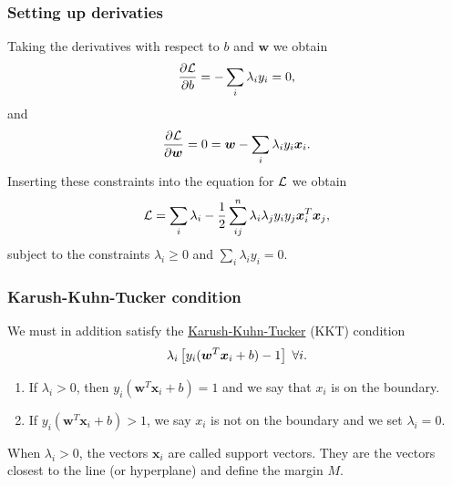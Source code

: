 \documentclass{beamer}
\begin{document}
\begin{frame}
\frametitle{Setting up derivaties}

Taking the derivatives  with respect to $b$ and $\bm{w}$ we obtain 
\[
\frac{\partial {\cal L}}{\partial b} = -\sum_{i} \lambda_iy_i=0,
\]
and 
\[
\frac{\partial {\cal L}}{\partial \bm{w}} = 0 = \bm{w}-\sum_{i} \lambda_iy_i\bm{x}_i.
\]
Inserting these constraints into the equation for ${\cal L}$ we obtain
\[
{\cal L}=\sum_i\lambda_i-\frac{1}{2}\sum_{ij}^n\lambda_i\lambda_jy_iy_j\bm{x}_i^T\bm{x}_j,
\]
subject to the constraints $\lambda_i\geq 0$ and $\sum_i\lambda_iy_i=0$.
\end{frame}

\begin{frame}
\frametitle{Karush-Kuhn-Tucker condition}

We must in addition satisfy the \href{{https://en.wikipedia.org/wiki/Karush%E2%80%93Kuhn%E2%80%93Tucker_conditions}}{Karush-Kuhn-Tucker} (KKT) condition
\[
\lambda_i\left[y_i(\bm{w}^T\bm{x}_i+b) -1\right] \hspace{0.1cm}\forall i.
\]
\begin{enumerate}
\item If $\lambda_i > 0$, then $y_i(\bm{w}^T\bm{x}_i+b)=1$ and we say that $x_i$ is on the boundary.

\item If $y_i(\bm{w}^T\bm{x}_i+b)> 1$, we say $x_i$ is not on the boundary and we set $\lambda_i=0$. 
\end{enumerate}

\noindent
When $\lambda_i > 0$, the vectors $\bm{x}_i$ are called support vectors. They are the vectors closest to the line (or hyperplane) and define the margin $M$.
\end{frame}
\end{document}
